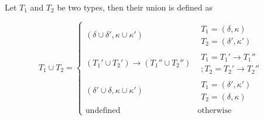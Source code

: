 \documentclass{llncs}
\begin{document}
\begin{definition}
  	Let $T_1$ and $T_2$ be two types, then their union is defined as

  \[
T_1\cup T_2=
    \begin{cases}
      (\delta\cup\delta',\kappa\cup\kappa') & \begin{array}{l}
                                                T_1=(\delta,\kappa) \\
      T_2=(\delta',\kappa') \end{array} \\[3mm]
       (T_1'\cup T_2')\rightarrow (T_1''\cup T_2'') &
       \begin{array}{l} T_1=T_1'\rightarrow T_1'' \\;T_2=T_2'\rightarrow
       T_2''  \end{array}\\[3mm]
       (\delta' \cup \delta, \kappa \cup \kappa') & \begin{array}{l}
                                                      T_1 =
                                                      (\delta',\kappa') \\
                                                      T_2 =
                                                      (\delta,\kappa) \end{array}
                                                    \\[3mm]
       \text{undefined} & \text{otherwise}
    \end{cases}
\]
\end{definition}
\end{document}
